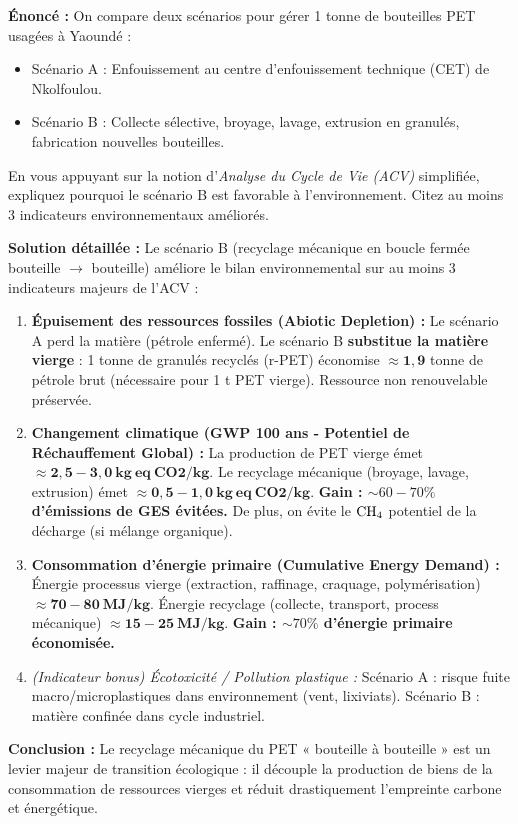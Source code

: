 \documentclass[11pt]{article}
\newcommand{\cle}[1]{{\popxbold\color{popdark}#1}}
\begin{document}
\begin{exoresolu}
\textbf{Énoncé :} On compare deux scénarios pour gérer 1 tonne de bouteilles PET usagées à Yaoundé :
\begin{itemize}
    \item Scénario A : Enfouissement au centre d'enfouissement technique (CET) de Nkolfoulou.
    \item Scénario B : Collecte sélective, broyage, lavage, extrusion en granulés, fabrication nouvelles bouteilles.
\end{itemize}
En vous appuyant sur la notion d'\emph{Analyse du Cycle de Vie (ACV)} simplifiée, expliquez pourquoi le scénario B est favorable à l'environnement. Citez au moins 3 indicateurs environnementaux améliorés.

\tcblower

\textbf{Solution détaillée :}
Le scénario B (recyclage mécanique en boucle fermée bouteille $\rightarrow$ bouteille) améliore le bilan environnemental sur au moins 3 indicateurs majeurs de l'ACV :
\begin{enumerate}
    \item \textbf{Épuisement des ressources fossiles (Abiotic Depletion) :} Le scénario A perd la matière (pétrole enfermé). Le scénario B \textbf{substitue la matière vierge} : 1 tonne de granulés recyclés (r-PET) économise $\approx \mathbf{1,9}$ tonne de pétrole brut (nécessaire pour 1 t PET vierge). Ressource non renouvelable préservée.
    \item \textbf{Changement climatique (GWP 100 ans - Potentiel de Réchauffement Global) :} La production de PET vierge émet $\approx \mathbf{2,5 - 3,0\ kg\ eq\ CO2/kg}$. Le recyclage mécanique (broyage, lavage, extrusion) émet $\approx \mathbf{0,5 - 1,0\ kg\ eq\ CO2/kg}$. \textbf{Gain : $\sim 60-70\%$ d'émissions de GES évitées.} De plus, on évite le $\ce{CH4}$ potentiel de la décharge (si mélange organique).
    \item \textbf{Consommation d'énergie primaire (Cumulative Energy Demand) :} Énergie processus vierge (extraction, raffinage, craquage, polymérisation) $\approx \mathbf{70-80\ MJ/kg}$. Énergie recyclage (collecte, transport, process mécanique) $\approx \mathbf{15-25\ MJ/kg}$. \textbf{Gain : $\sim 70\%$ d'énergie primaire économisée.}
    \item \textit{(Indicateur bonus) Écotoxicité / Pollution plastique :} Scénario A : risque fuite macro/microplastiques dans environnement (vent, lixiviats). Scénario B : matière confinée dans cycle industriel.
\end{enumerate}
\textbf{Conclusion :} Le recyclage mécanique du PET « bouteille à bouteille » est un levier majeur de \cle{transition écologique} : il découple la production de biens de la consommation de ressources vierges et réduit drastiquement l'empreinte carbone et énergétique.
\end{exoresolu}
\end{document}
